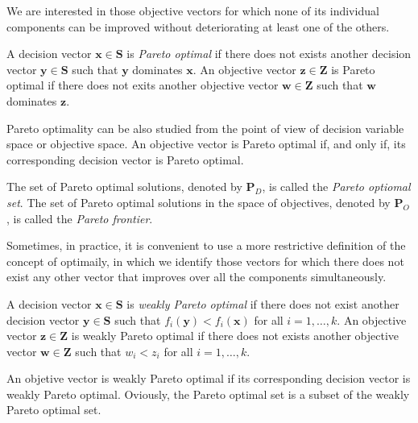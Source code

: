 {We are interested in those objective vectors for which none of its individual components can be improved without deteriorating at least one of the others.

\begin{definition}
\label{def:pareto_optimal}
A decision vector $\mathbf{x} \in \mathbf{S}$ is \emph{Pareto optimal} if there does not exists another decision vector $\mathbf{y} \in \mathbf{S}$ such that $\mathbf{y}$ dominates $\mathbf{x}$. An objective vector $\mathbf{z} \in \mathbf{Z}$ is Pareto optimal if there does not exits another objective vector $\mathbf{w} \in \mathbf{Z}$ such that $\mathbf{w}$ dominates $\mathbf{z}$.
\end{definition}

Pareto optimality can be also studied from the point of view of decision variable space or objective space. An objective vector is Pareto optimal if, and only if, its corresponding decision vector is Pareto optimal.

\begin{definition}
The set of Pareto optimal solutions, denoted by $\mathbf{P}_D$, is called the \emph{Pareto optiomal set}. The set of Pareto optimal solutions in the space of objectives, denoted by $\mathbf{P}_O$, is called the \emph{Pareto frontier}.
\end{definition}

Sometimes, in practice, it is convenient to use a more restrictive definition of the concept of optimaily, in which we identify those vectors for which there does not exist any other vector that improves over all the components simultaneously.

\begin{definition}
A decision vector $\mathbf{x} \in \mathbf{S}$ is \emph{weakly Pareto optimal} if there does not exist another decision vector $\mathbf{y} \in \mathbf{S}$ such that $f_i ( \mathbf{y} ) < f_i ( \mathbf{x} )$ for all $i = 1, \ldots, k$. An objective vector $\mathbf{z} \in \mathbf{Z}$ is weakly Pareto optimal if there does not exists another objective vector $\mathbf{w} \in \mathbf{Z}$ such that $w_i < z_i$ for all $i = 1, \ldots, k$.
\end{definition}

An objetive vector is weakly Pareto optimal if its corresponding decision vector is weakly Pareto optimal. Oviously, the Pareto optimal set is a subset of the weakly Pareto optimal set.

}
